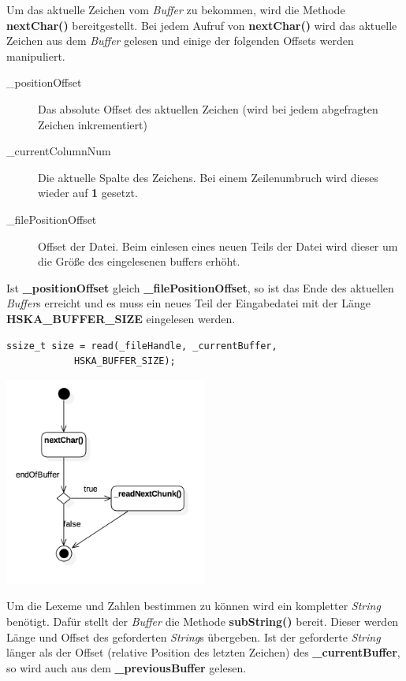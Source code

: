 \documentclass[
    a4paper
]{scrreprt}
\begin{document}
	Um das aktuelle Zeichen vom \textit{Buffer} zu bekommen, wird die Methode \textbf{nextChar()} bereitgestellt. Bei jedem Aufruf von \textbf{nextChar()} wird das aktuelle Zeichen aus dem \textit{Buffer} gelesen und einige der folgenden Offsets werden manipuliert.
	\begin{description}
		\item[\_positionOffset] Das absolute Offset des aktuellen Zeichen (wird bei jedem abgefragten Zeichen inkrementiert)
		\item[\_currentColumnNum] Die aktuelle Spalte des Zeichens. Bei einem Zeilenumbruch wird dieses wieder auf \textbf{1} gesetzt.
		\item[\_filePositionOffset] Offset der Datei. Beim einlesen eines neuen Teils der Datei wird dieser um die Größe des eingelesenen buffers erhöht. 
	\end{description}
	
	Ist \textbf{\_positionOffset} gleich \textbf{\_filePositionOffset}, so ist das Ende des aktuellen \textit{Buffer}s erreicht und es muss ein neues Teil der Eingabedatei mit der Länge \textbf{HSKA\_BUFFER\_SIZE} eingelesen werden.
	\begin{lstlisting}
ssize_t size = read(_fileHandle, _currentBuffer, 
		    HSKA_BUFFER_SIZE);
	\end{lstlisting}
	
	\begin{center}
		\includegraphics[width=0.5\textwidth]{./images/buffer_activity.png}
	\end{center}
	
	Um die Lexeme und Zahlen bestimmen zu können wird ein kompletter \textit{String} benötigt. Dafür stellt der \textit{Buffer} die Methode \textbf{subString()} bereit. Dieser werden Länge und Offset des geforderten \textit{String}s übergeben.
	Ist der geforderte \textit{String} länger als der Offset (relative Position des letzten Zeichen) des \textbf{\_currentBuffer}, so wird auch aus dem \textbf{\_previousBuffer} gelesen.
    
\end{document}
